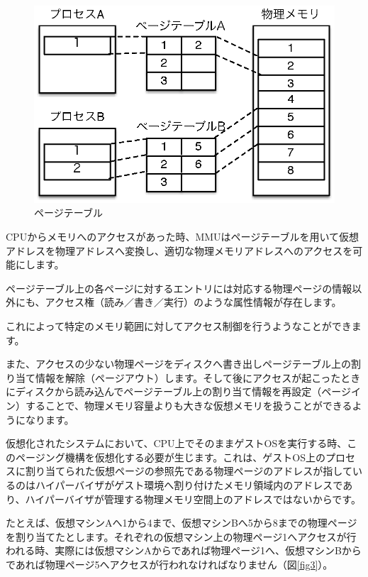 \documentclass[a4j,12pt]{jarticle}
\begin{document}
\begin{figure}
\includegraphics{figures/part2_fig2.eps}
\caption{ページテーブル}
\label{fig2}
\end{figure}

CPUからメモリへのアクセスがあった時、MMUはページテーブルを用いて仮想アドレスを物理アドレスへ変換し、適切な物理メモリアドレスへのアクセスを可能にします。

ページテーブル上の各ページに対するエントリには対応する物理ページの情報以外にも、アクセス権（読み／書き／実行）のような属性情報が存在します。

これによって特定のメモリ範囲に対してアクセス制御を行うようなことができます。

また、アクセスの少ない物理ページをディスクへ書き出しページテーブル上の割り当て情報を解除（ページアウト）します。そして後にアクセスが起こったときにディスクから読み込んでページテーブル上の割り当て情報を再設定（ページイン）することで、物理メモリ容量よりも大きな仮想メモリを扱うことができるようになります。

仮想化されたシステムにおいて、CPU上でそのままゲストOSを実行する時、このページング機構を仮想化する必要が生じます。これは、ゲストOS上のプロセスに割り当てられた仮想ページの参照先である物理ページのアドレスが指しているのはハイパーバイザがゲスト環境へ割り付けたメモリ領域内のアドレスであり、ハイパーバイザが管理する物理メモリ空間上のアドレスではないからです。

たとえば、仮想マシンAへ1から4まで、仮想マシンBへ5から8までの物理ページを割り当てたとします。それぞれの仮想マシン上の物理ページ1へアクセスが行われる時、実際には仮想マシンAからであれば物理ページ1へ、仮想マシンBからであれば物理ページ5へアクセスが行われなければなりません（図\ref{fig3}）。
\end{document}
